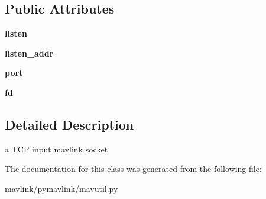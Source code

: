 \subsection*{Public Attributes}
\begin{DoxyCompactItemize}
\item 
\mbox{\label{classpymavlink_1_1mavutil_1_1mavtcpin_af5b9dcb071c37a29afd980fb2c789d12}} 
{\bfseries listen}
\item 
\mbox{\label{classpymavlink_1_1mavutil_1_1mavtcpin_ab4726449bada09c361de417e1fc815af}} 
{\bfseries listen\+\_\+addr}
\item 
\mbox{\label{classpymavlink_1_1mavutil_1_1mavtcpin_a8586f3238dd3f55049b9802821c9ee10}} 
{\bfseries port}
\item 
\mbox{\label{classpymavlink_1_1mavutil_1_1mavtcpin_a6789551b18ad3117274da632d46b4b20}} 
{\bfseries fd}
\end{DoxyCompactItemize}


\subsection{Detailed Description}
\begin{DoxyVerb}a TCP input mavlink socket\end{DoxyVerb}
 

The documentation for this class was generated from the following file\+:\begin{DoxyCompactItemize}
\item 
mavlink/pymavlink/mavutil.\+py\end{DoxyCompactItemize}
